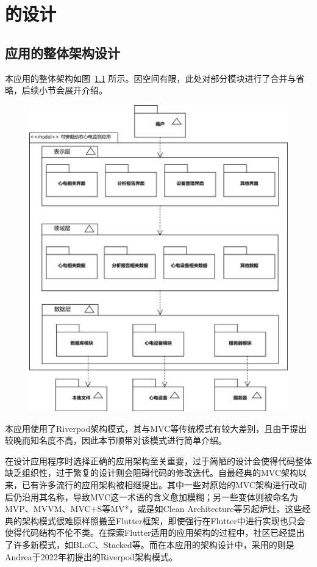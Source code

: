 

\chapter{\app 的设计}\label{ch:design}


\section{应用的整体架构设计}\label{sec:arch-design}

本应用的整体架构如图~\ref{fig:model} 所示。因空间有限，此处对部分模块进行了合并与省略，后续小节会展开介绍。

\begin{figure}[!ht]
    \centering
    \includegraphics[width=.9\textwidth]{../assets/model.drawio}
    \label{fig:model}
\end{figure}

本应用使用了Riverpod架构模式\cite{bizzottoFlutterAppArchitecture}，其与MVC等传统模式有较大差别，且由于提出较晚而知名度不高，因此本节顺带对该模式进行简单介绍。

在设计应用程序时选择正确的应用架构至关重要，过于简陋的设计会使得代码整体缺乏组织性，过于繁复的设计则会阻碍代码的修改迭代。自最经典的MVC架构以来，已有许多流行的应用架构被相继提出。其中一些对原始的MVC架构进行改动后仍沿用其名称，导致MVC这一术语的含义愈加模糊；另一些变体则被命名为MVP、MVVM、MVC+S等MV*，或是如Clean Architecture等另起炉灶。这些经典的架构模式很难原样照搬至Flutter框架，即使强行在Flutter中进行实现也只会使得代码结构不伦不类。在探索Flutter适用的应用架构的过程中，社区已经提出了许多新模式，如BLoC、Stacked等。而在本应用的架构设计中，采用的则是Andrea于2022年初提出的Riverpod架构模式。

